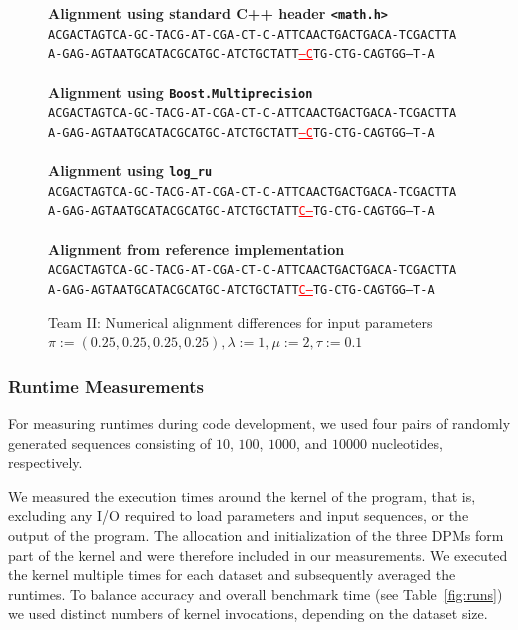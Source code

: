 \documentclass[runningheads,a4paper]{llncs}
\begin{document}
\begin{figure}

\textbf{Alignment using standard C++ header \texttt{<math.h>}}
~
\\
\texttt{ACGACTAGTCA-GC-TACG-AT-CGA-CT-C-ATTCAACTGACTGACA-TCGACTTA} \\
\texttt{A-GAG-AGTAATGCATACGCATGC-ATCTGCTATT\textcolor{red}{\underline{---C}}TG-CTG-CAGTGG--T-A}
\\~\\
\textbf{Alignment using \texttt{Boost.Multiprecision}}
~
\\
\texttt{ACGACTAGTCA-GC-TACG-AT-CGA-CT-C-ATTCAACTGACTGACA-TCGACTTA} \\
\texttt{A-GAG-AGTAATGCATACGCATGC-ATCTGCTATT\textcolor{red}{\underline{---C}}TG-CTG-CAGTGG--T-A}
\\~\\
\textbf{Alignment using \texttt{log\_ru}}
~
\\
\texttt{ACGACTAGTCA-GC-TACG-AT-CGA-CT-C-ATTCAACTGACTGACA-TCGACTTA} \\
\texttt{A-GAG-AGTAATGCATACGCATGC-ATCTGCTATT\textcolor{red}{\underline{C---}}TG-CTG-CAGTGG--T-A}
\\~\\
\textbf{Alignment from reference implementation}
~
\\
\texttt{ACGACTAGTCA-GC-TACG-AT-CGA-CT-C-ATTCAACTGACTGACA-TCGACTTA} \\
\texttt{A-GAG-AGTAATGCATACGCATGC-ATCTGCTATT\textcolor{red}{\underline{C---}}TG-CTG-CAGTGG--T-A}

\caption{Team II: Numerical alignment differences for input parameters $\pi:=(0.25,0.25,0.25,0.25), \lambda:=1, \mu:= 2, \tau := 0.1$}
\label{fig:alignments}
\end{figure}

\subsubsection{Runtime Measurements}
\label{team2-runtimes}

For measuring runtimes during code development, we used four pairs of randomly generated sequences consisting of $10$, $100$, $1000$, and $10000$ nucleotides, respectively.

We measured the execution times around the kernel of the program, that is, excluding any I/O required to load parameters and input sequences, or the output of the program. 
The allocation and initialization of the three DPMs form part of the kernel and were therefore included in our measurements.
We executed the kernel multiple times for each dataset and subsequently averaged the runtimes.
To balance accuracy and overall benchmark time (see Table~\ref{fig:runs}) we used distinct numbers of kernel invocations, depending on the dataset size.
\end{document}
